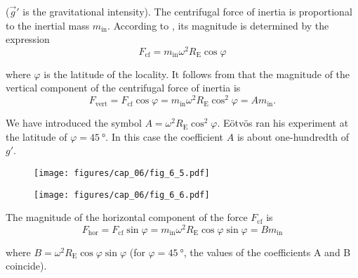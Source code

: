 \noindent
($\vec{g}'$ is the gravitational intensity). The centrifugal force of inertia is proportional to the inertial mass $m_{\text{in}}$. According to , its magnitude is determined by the expression
\begin{equation*}
	F_{\text{cf}} = m_{\text{in}}\omega^2R_{\text{E}}\cos\varphi
\end{equation*}

\noindent
where $\varphi$ is the latitude of the locality. It follows from  that the magnitude of the vertical component of the centrifugal force of inertia is
\begin{equation*}
	F_{\text{vert}} = F_{\text{cf}}\cos\varphi =  m_{\text{in}}\omega^2R_{\text{E}}\cos^2\varphi = Am_{\text{in}}.
\end{equation*}

\noindent
We have introduced the symbol $A=\omega^2R_{\text{E}}\cos^2\varphi$. E\"{o}tv\"{o}s ran his experiment at the latitude of $\varphi=\SI{45}{\degree}$. In this case the coefficient $A$ is about one-hundredth of $g'$.

\begin{figure}[t]
	\begin{minipage}[t]{0.5\linewidth}
		\begin{center}
			\texttt{[image: figures/cap\_06/fig\_6\_5.pdf]}
			\caption[]{}
			\label{fig:6_5}
		\end{center}
	\end{minipage}
	\hspace{-0.05cm}
	\begin{minipage}[t]{0.5\linewidth}
		\begin{center}
			\texttt{[image: figures/cap\_06/fig\_6\_6.pdf]}
			\caption[]{}
			\label{fig:6_6}
		\end{center}
	\end{minipage}
	\vspace{-0.5cm}
\end{figure}

The magnitude of the horizontal component of the force $F_{\text{cf}}$ is
\begin{equation*}
	F_{\text{hor}} = F_{\text{cf}}\sin\varphi =  m_{\text{in}}\omega^2R_{\text{E}}\cos\varphi\sin\varphi = Bm_{\text{in}}
\end{equation*}

\noindent
where $B=\omega^2R_{\text{E}}\cos\varphi\sin\varphi$ (for $\varphi=\SI{45}{\degree}$, the values of the coefficients A and B coincide).


